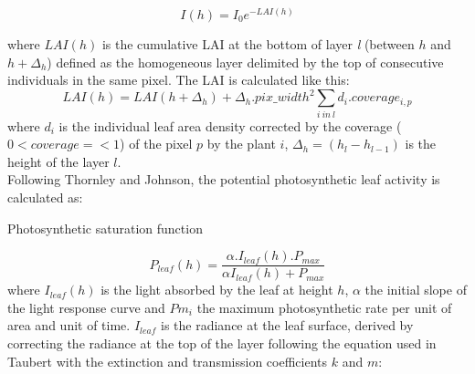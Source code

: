 \documentclass[a4paper,twoside, justified,marginals=raggedright, nobib]{tufte-handout}
\begin{document}
\begin{equation}\label{eq:Ih}
I(h) =  I_{0} e^{-LAI(h)}
\end{equation}

where $LAI(h)$ is the cumulative LAI at the bottom of layer \textit{l} (between $h$ and $h+\Delta_{h}$) defined as the homogeneous layer delimited by the top of consecutive individuals in the same pixel. The LAI is calculated like this:
\begin{equation}\label{eq:LAI}
LAI(h) = LAI(h+\Delta_{h}) +   \Delta_{h} . pix\_width^{2} \sum_{i\ in\ l}d_{i}.coverage_{i, p}
\end{equation}
where $d_{i}$ is the individual leaf area density corrected by the coverage ($0< coverage =< 1$) of the pixel $p$ by the plant $i$, $\Delta_{h} = (h_{l} - h_{l-1})$ is the height of the layer $l$.\\
Following Thornley and Johnson, the potential photosynthetic leaf activity is calculated as:


\begin{marginfigure}
\label{fig:derivaives}
\caption{Photosynthetic saturation function}
\end{marginfigure}

\begin{equation}\label{eq:Pleaf}
P_{leaf}(h) = \frac{\alpha. I_{leaf}(h).P_{max}}{\alpha I_{leaf}(h)+P_{max}}
\end{equation}
where $I_{leaf}(h)$ is the light absorbed by the leaf at height $h$, $\alpha$ the initial slope of the light response curve and $Pm_{i}$ the maximum photosynthetic rate per unit of area and unit of time.
$I_{leaf}$ is the radiance at the leaf surface, derived by correcting the radiance at the top of the layer following the equation used in Taubert with the extinction and transmission coefficients $k$ and $m$:
\end{document}
